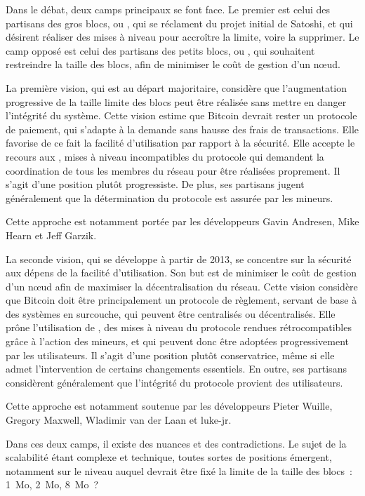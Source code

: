Dans le débat, deux camps principaux se font face. Le premier est celui des partisans des gros blocs, ou , qui se réclament du projet initial de Satoshi, et qui désirent réaliser des mises à niveau pour accroître la limite, voire la supprimer. Le camp opposé est celui des partisans des petits blocs, ou , qui souhaitent restreindre la taille des blocs, afin de minimiser le coût de gestion d'un nœud.

La première vision, qui est au départ majoritaire, considère que l'augmentation progressive de la taille limite des blocs peut être réalisée sans mettre en danger l'intégrité du système. Cette vision estime que Bitcoin devrait rester un protocole de paiement, qui s'adapte à la demande sans hausse des frais de transactions. Elle favorise de ce fait la facilité d'utilisation par rapport à la sécurité. Elle accepte le recours aux , mises à niveau incompatibles du protocole qui demandent la coordination de tous les membres du réseau pour être réalisées proprement. Il s'agit d'une position plutôt progressiste. De plus, ses partisans jugent généralement que la détermination du protocole est assurée par les mineurs. %

Cette approche est notamment portée par les développeurs Gavin Andresen, Mike Hearn et Jeff Garzik.

La seconde vision, qui se développe à partir de 2013, se concentre sur la sécurité aux dépens de la facilité d'utilisation. Son but est de minimiser le coût de gestion d'un nœud afin de maximiser la décentralisation du réseau. Cette vision considère que Bitcoin doit être principalement un protocole de règlement, servant de base à des systèmes en surcouche, qui peuvent être centralisés ou décentralisés. Elle prône l'utilisation de , des mises à niveau du protocole rendues rétrocompatibles grâce à l'action des mineurs, et qui peuvent donc être adoptées progressivement par les utilisateurs. Il s'agit d'une position plutôt conservatrice, même si elle admet l'intervention de certains changements essentiels. En outre, ses partisans considèrent généralement que l'intégrité du protocole provient des utilisateurs.  %

Cette approche est notamment soutenue par les développeurs Pieter Wuille, Gregory Maxwell, Wladimir van der Laan et luke-jr.

Dans ces deux camps, il existe des nuances et des contradictions. Le sujet de la scalabilité étant complexe et technique, toutes sortes de positions émergent, notamment sur le niveau auquel devrait être fixé la limite de la taille des blocs~: 1~Mo, 2~Mo, 8~Mo~?


